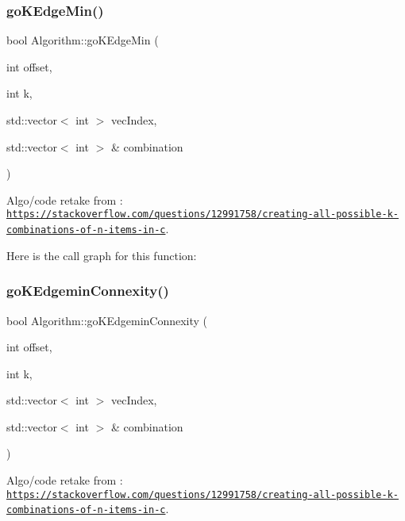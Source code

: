 \mbox{\label{struct_algorithm_a4f5902055c640f4ec1a037e7c24cb772}} 
\subsubsection{\texorpdfstring{go\+K\+Edge\+Min()}{goKEdgeMin()}}
{\footnotesize\ttfamily bool Algorithm\+::go\+K\+Edge\+Min (\begin{DoxyParamCaption}\item[{int}]{offset,  }\item[{int}]{k,  }\item[{std\+::vector$<$ int $>$}]{vec\+Index,  }\item[{std\+::vector$<$ int $>$ \&}]{combination }\end{DoxyParamCaption})}



Algo/code retake from \+: \href{https://stackoverflow.com/questions/12991758/creating-all-possible-k-combinations-of-n-items-in-c}{\tt https\+://stackoverflow.\+com/questions/12991758/creating-\/all-\/possible-\/k-\/combinations-\/of-\/n-\/items-\/in-\/c}. 

Here is the call graph for this function\+:
\mbox{\label{struct_algorithm_a1baf45c10fc672bea255be518c5c3173}} 
\subsubsection{\texorpdfstring{go\+K\+Edgemin\+Connexity()}{goKEdgeminConnexity()}}
{\footnotesize\ttfamily bool Algorithm\+::go\+K\+Edgemin\+Connexity (\begin{DoxyParamCaption}\item[{int}]{offset,  }\item[{int}]{k,  }\item[{std\+::vector$<$ int $>$}]{vec\+Index,  }\item[{std\+::vector$<$ int $>$ \&}]{combination }\end{DoxyParamCaption})}



Algo/code retake from \+: \href{https://stackoverflow.com/questions/12991758/creating-all-possible-k-combinations-of-n-items-in-c}{\tt https\+://stackoverflow.\+com/questions/12991758/creating-\/all-\/possible-\/k-\/combinations-\/of-\/n-\/items-\/in-\/c}. 

